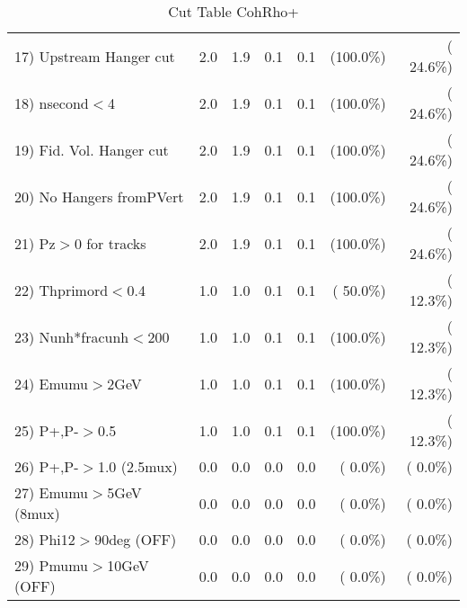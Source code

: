 \begin{table}[h!]
\begin{tabular}{||l||r|r|r|r|r|r||}
 17) Upstream Hanger cut  &          2.0 &          1.9 &          0.1 &          0.1 & (100.0\%) & ( 24.6\%) \\
 18) nsecond$<$4          &          2.0 &          1.9 &          0.1 &          0.1 & (100.0\%) & ( 24.6\%) \\
 19) Fid. Vol. Hanger cut &          2.0 &          1.9 &          0.1 &          0.1 & (100.0\%) & ( 24.6\%) \\
 20) No Hangers fromPVert &          2.0 &          1.9 &          0.1 &          0.1 & (100.0\%) & ( 24.6\%) \\
 21) Pz$>$0 for tracks    &          2.0 &          1.9 &          0.1 &          0.1 & (100.0\%) & ( 24.6\%) \\
 22) Thprimord$<$0.4      &          1.0 &          1.0 &          0.1 &          0.1 & ( 50.0\%) & ( 12.3\%) \\
 23) Nunh*fracunh$<$200   &          1.0 &          1.0 &          0.1 &          0.1 & (100.0\%) & ( 12.3\%) \\
 24) Emumu$>$2GeV         &          1.0 &          1.0 &          0.1 &          0.1 & (100.0\%) & ( 12.3\%) \\
 25) P+,P-$>$0.5          &          1.0 &          1.0 &          0.1 &          0.1 & (100.0\%) & ( 12.3\%) \\
 26) P+,P-$>$1.0 (2.5mux) &          0.0 &          0.0 &          0.0 &          0.0 & (  0.0\%) & (  0.0\%) \\
 27) Emumu$>$5GeV  (8mux) &          0.0 &          0.0 &          0.0 &          0.0 & (  0.0\%) & (  0.0\%) \\
 28) Phi12$>$90deg  (OFF) &          0.0 &          0.0 &          0.0 &          0.0 & (  0.0\%) & (  0.0\%) \\
 29) Pmumu$>$10GeV  (OFF) &          0.0 &          0.0 &          0.0 &          0.0 & (  0.0\%) & (  0.0\%) \\
 \hline
 \hline
 \end{tabular}
 \caption{Cut Table  CohRho+  }
 \label{tab-cutcohjpsi-mumu_anumunc}
 \end{table}

